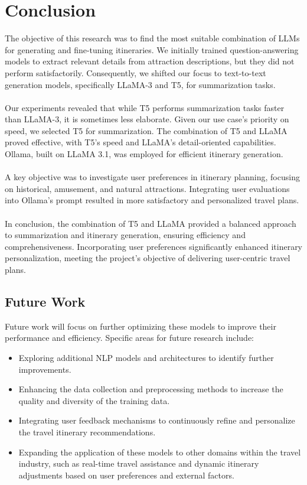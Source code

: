 \documentclass[conference]{IEEEtran}
\begin{document}
\section{Conclusion}

The objective of this research was to find the most suitable combination of LLMs for generating and fine-tuning itineraries. We initially trained question-answering models to extract relevant details from attraction descriptions, but they did not perform satisfactorily. Consequently, we shifted our focus to text-to-text generation models, specifically LLaMA-3 and T5, for summarization tasks.
{\\\\}
Our experiments revealed that while T5 performs summarization tasks faster than LLaMA-3, it is sometimes less elaborate. Given our use case’s priority on speed, we selected T5 for summarization. The combination of T5 and LLaMA proved effective, with T5's speed and LLaMA's detail-oriented capabilities. Ollama, built on LLaMA 3.1, was employed for efficient itinerary generation.
{\\\\}
A key objective was to investigate user preferences in itinerary planning, focusing on historical, amusement, and natural attractions. Integrating user evaluations into Ollama's prompt resulted in more satisfactory and personalized travel plans.
{\\\\}
In conclusion, the combination of T5 and LLaMA provided a balanced approach to summarization and itinerary generation, ensuring efficiency and comprehensiveness. Incorporating user preferences significantly enhanced itinerary personalization, meeting the project’s objective of delivering user-centric travel plans.



    \subsection{Future Work}

        Future work will focus on further optimizing these models to improve their performance and efficiency. Specific areas for future research include:
        \begin{itemize}
            \item Exploring additional NLP models and architectures to identify further improvements.
            \item Enhancing the data collection and preprocessing methods to increase the quality and diversity of the training data.
            \item Integrating user feedback mechanisms to continuously refine and personalize the travel itinerary recommendations.
            \item Expanding the application of these models to other domains within the travel industry, such as real-time travel assistance and dynamic itinerary adjustments based on user preferences and external factors.
        \end{itemize}
\end{document}
